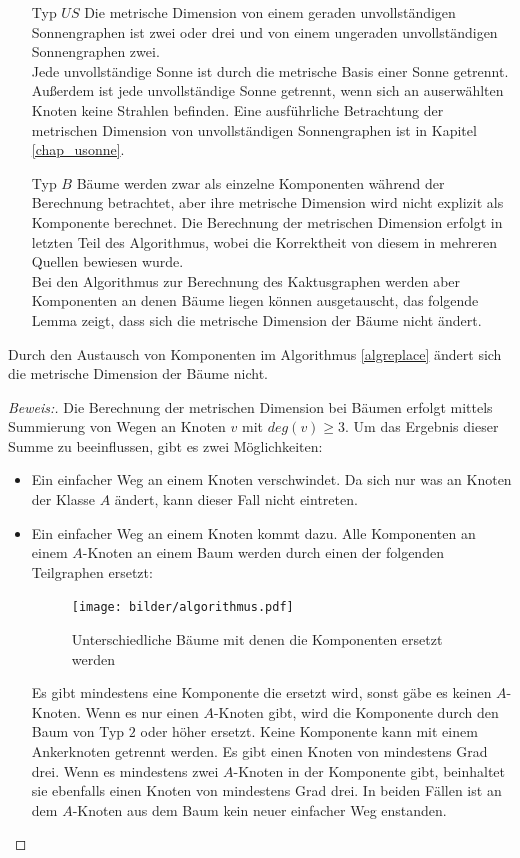 \begin{itemize}
\item[Typ $US$]
Die metrische Dimension von einem geraden unvollständigen Sonnengraphen ist zwei oder drei und von einem ungeraden unvollständigen Sonnengraphen zwei.\\
Jede unvollständige Sonne ist durch die metrische Basis einer Sonne getrennt. Außerdem ist jede unvollständige Sonne getrennt, wenn sich an auserwählten Knoten keine Strahlen befinden. Eine ausführliche Betrachtung der metrischen Dimension von unvollständigen Sonnengraphen ist in Kapitel \ref{chap_usonne}.
\item[Typ $B$]
Bäume werden zwar als einzelne Komponenten während der Berechnung betrachtet, aber ihre metrische Dimension wird nicht explizit als Komponente berechnet. Die Berechnung der metrischen Dimension erfolgt in letzten Teil des Algorithmus, wobei die Korrektheit von diesem in mehreren Quellen bewiesen wurde.\\
Bei den Algorithmus zur Berechnung des Kaktusgraphen werden aber Komponenten an denen Bäume liegen können ausgetauscht, das folgende Lemma zeigt, dass sich die metrische Dimension der Bäume nicht ändert.
\end{itemize}
\begin{lem}
Durch den Austausch von Komponenten im Algorithmus \ref{algreplace} ändert sich die metrische Dimension der Bäume nicht.
\end{lem}
\begin{proof}[Beweis:]
Die Berechnung der metrischen Dimension bei Bäumen erfolgt mittels Summierung von Wegen an Knoten $v$ mit $deg(v)\geq 3$. Um das Ergebnis dieser Summe zu beeinflussen, gibt es zwei Möglichkeiten:
\begin{itemize}
\item Ein einfacher Weg an einem Knoten verschwindet.
Da sich nur was an Knoten der Klasse $A$ ändert, kann dieser Fall nicht eintreten. 
\item Ein einfacher Weg an einem Knoten kommt dazu. Alle Komponenten an einem $A$-Knoten an einem Baum werden durch einen der folgenden Teilgraphen ersetzt:
\vspace{-4mm}
\begin{figure}[h!]
		\centering 		 
   \texttt{[image: bilder/algorithmus.pdf]}
	\caption{Unterschiedliche Bäume mit denen die Komponenten ersetzt werden}
  	 \end{figure}
Es gibt mindestens eine Komponente die ersetzt wird, sonst gäbe es keinen $A$-Knoten. Wenn es nur einen $A$-Knoten gibt, wird die Komponente durch den Baum von Typ $2$ oder höher ersetzt. Keine Komponente kann mit einem Ankerknoten getrennt werden. Es gibt einen Knoten von mindestens Grad drei. Wenn es mindestens zwei $A$-Knoten in der Komponente gibt, beinhaltet sie ebenfalls einen Knoten von mindestens Grad drei. In beiden Fällen ist an dem $A$-Knoten aus dem Baum kein neuer einfacher Weg enstanden.
\end{itemize}

\end{proof}
